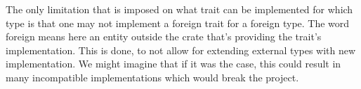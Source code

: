 
%
%
%    

The only limitation that is imposed on what trait can be implemented for which type is that one may not implement a foreign trait for a foreign type. The word foreign means here an entity outside the crate that's providing the trait's implementation. This is done, to not allow for extending external types with new implementation. We might imagine that if it was the case, this could result in many incompatible implementations which would break the project.

